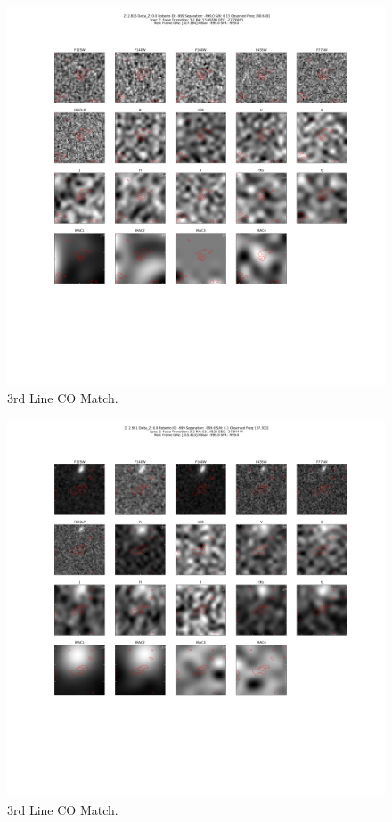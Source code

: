 \begin{figure}[tbp]
\centering \includegraphics[width=120mm]{Matched/ASPECS_Cutout_31.png}
\caption{3rd Line CO Match.}
\label{fig:Match_Three}
\end{figure}

\begin{figure}[tbp]
\centering \includegraphics[width=120mm]{Matched/ASPECS_Cutout_32.png}
\caption{3rd Line CO Match.}
\label{fig:Match_Three}
\end{figure}


